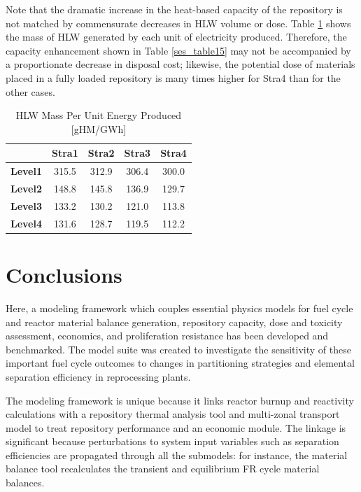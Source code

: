 Note that the dramatic increase in the heat-based capacity of the
repository is not matched by commensurate decreases in HLW volume or
dose.  Table \ref{ses_table17} shows the mass of HLW generated by each unit of
electricity produced. Therefore, the capacity
enhancement shown in Table \ref{ses_table15} may not be accompanied by a proportionate
decrease in disposal cost; likewise, the potential dose of materials
placed in a fully loaded repository is many times higher for Stra4 than
for the other cases.  

\begin{table}[htbp]
\begin{center}
\caption{HLW Mass Per Unit Energy Produced [gHM/GWh]}
\label{ses_table17}
\begin{tabular}{|l|c|c|c|c|}
\hline
                & \textbf{Stra1} & \textbf{Stra2} & \textbf{Stra3} & \textbf{Stra4} \\
\hline
\textbf{Level1} & 315.5          & 312.9          & 306.4          & 300.0 \\
\textbf{Level2} & 148.8          & 145.8          & 136.9          & 129.7 \\
\textbf{Level3} & 133.2          & 130.2          & 121.0          & 113.8 \\
\textbf{Level4} & 131.6          & 128.7          & 119.5          & 112.2 \\
\hline
\end{tabular}
\end{center}
\end{table}




\section{Conclusions}
\label{ses_sec:conclusions}
Here, a modeling framework which couples essential physics models for fuel
cycle and reactor material balance generation, repository capacity, dose
and toxicity assessment, economics, and proliferation resistance has been 
developed and benchmarked.  The
model suite was created to investigate the sensitivity of these
important fuel cycle outcomes to changes in partitioning strategies and
elemental separation efficiency in reprocessing plants.

The modeling framework is unique because it links reactor burnup and reactivity
calculations with a repository thermal analysis tool and
multi-zonal transport model to treat repository performance and an
economic module.  The linkage is significant because perturbations to
system input variables such as separation efficiencies are propagated
through all the submodels: for instance, the material balance tool
recalculates the transient and equilibrium FR cycle material balances.

